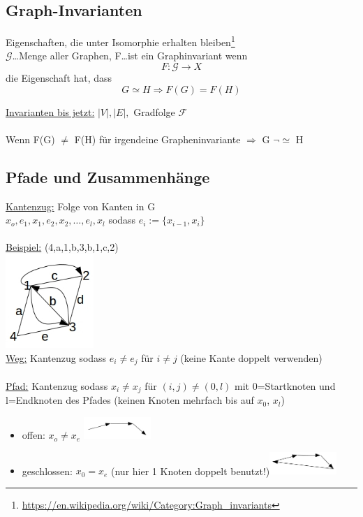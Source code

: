 \subsection{Graph-Invarianten}
Eigenschaften, die unter Isomorphie erhalten bleiben\footnote{\url{https://en.wikipedia.org/wiki/Category:Graph_invariants}}\\
$\mathcal{G}$…Menge aller Graphen, F…ist ein Graphinvariant wenn\\
\begin{equation}
	F:\mathcal{G} \rightarrow X
\end{equation}
die Eigenschaft hat, dass
\begin{equation}
	G \simeq H \Rightarrow F(G) = F(H)
\end{equation}

\underline{Invarianten bis jetzt:} $|V|, |E|,$ Gradfolge $\mathcal{F}$\\\\
Wenn F(G) $\neq$ F(H) für irgendeine Grapheninvariante $\Rightarrow$ G $\neg \simeq$ H

\subsection{Pfade und Zusammenhänge}

\underline{Kantenzug:} Folge von Kanten in G\\
$x_o,e_1,x_1,e_2,x_2,…,e_l,x_l$ sodass $e_i:=\{x_{i-1},x_i\}$\\\\
\underline{Beispiel:} (4,a,1,b,3,b,1,c,2)\\
\includegraphics[width=0.25\textwidth]{lectures/161014/pix/10.jpg}\\
\underline{Weg:} Kantenzug sodass $e_i \neq e_j$ für $i \neq j$ (keine Kante doppelt verwenden)\\\\
\underline{Pfad:} Kantenzug sodass $x_i \neq x_j$ für $(i,j) \neq (0,l)$ mit 0=Startknoten und l=Endknoten des Pfades (keinen Knoten mehrfach bis auf $x_0$, $x_l$)
\begin{itemize}
	\item offen: $x_o \neq x_e$ \includegraphics[width=0.2\textwidth]{lectures/161014/pix/11.jpg}
	\item geschlossen: $x_0=x_e$ (nur hier 1 Knoten doppelt benutzt!)\includegraphics[width=0.2\textwidth]{lectures/161014/pix/12.jpg}
\end{itemize}

